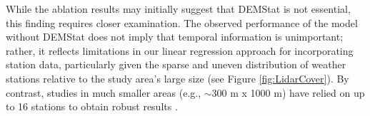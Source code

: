 \documentclass[preprint,12pt]{elsarticle}
\begin{document}
\begin{table}[htbp]
\caption{MAE (in meters) in validation obtained from the ablation study, with all variables included except the one indicated. The best result is in bold.}
\label{Table:LOO}
\centering
{}
\end{table}

While the ablation results may initially suggest that DEMStat is not essential, this finding requires closer examination. The observed performance of the model without DEMStat does not imply that temporal information is unimportant; rather, it reflects limitations in our linear regression approach for incorporating station data, particularly given the sparse and uneven distribution of weather stations relative to the study area's large size (see Figure \ref{fig:LidarCover}). By contrast, studies in much smaller areas (e.g., $\sim$300 m x 1000 m) have relied on up to 16 stations to obtain robust results \cite{Geissler2023}.
\end{document}
